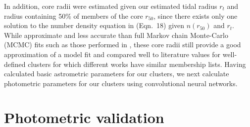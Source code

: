 In addition, \cite{king_structure_1962} core radii were estimated given our estimated tidal radius $r_{t}$ and radius containing 50\% of members of the core $r_{50}$, since there exists only one solution to the number density equation in \cite{king_structure_1962} (Eqn.~18) given $n(r_{50})$ and $r_{t}$. While approximate and less accurate than full Markov chain Monte-Carlo (MCMC) fits such as those performed in \cite{tarricq_structural_2022}, these core radii still provide a good approximation of a \cite{king_structure_1962} model fit and compared well to literature values for well-defined clusters for which different works have similar membership lists. Having calculated basic astrometric parameters for our clusters, we next calculate photometric parameters for our clusters using convolutional neural networks.



\section{Photometric validation}\label{c3:sec:cmd_classifier}  %

